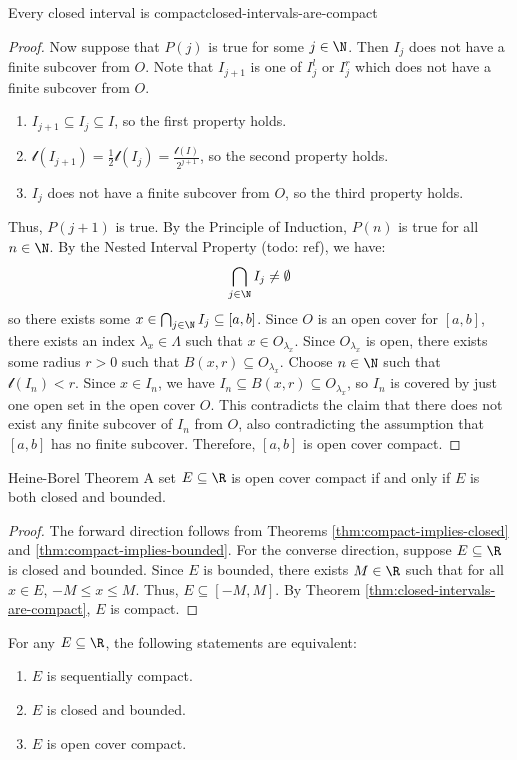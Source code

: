 \begin{thmbox}{Every closed interval is compact}{closed-intervals-are-compact}
\begin{proof}
        Now suppose that $P(j)$ is true for some $j \in \N$. Then $I_j$ does not have a finite subcover from $O$.
        Note that $I_{j+1}$ is one of $I_j^l$ or $I_j^r$ which does not have a finite subcover from $O$.
        \begin{enumerate}
            \item $I_{j+1} \subseteq I_j \subseteq I$, so the first property holds.
            \item $\mathscr{l}(I_{j+1}) = \frac{1}{2} \mathscr{l}(I_j) = \frac{\mathscr{l}(I)}{2^{j+1}}$, so the second property holds.
            \item $I_j$ does not have a finite subcover from $O$, so the third property holds.
        \end{enumerate}
        Thus, $P(j+1)$ is true. By the Principle of Induction, $P(n)$ is true for all $n \in \N$. By the Nested Interval Property (todo: ref), we have:
        \[ \bigcap_{j \in \N} I_j \neq \emptyset \]
        so there exists some $x \in \bigcap_{j \in \N} I_j \subseteq [a,b]$. Since $O$ is an open cover for $[a,b]$, there exists an index $\lambda_x \in \Lambda$ such that $x \in O_{\lambda_x}$. Since $O_{\lambda_x}$ is open, there exists some radius $r > 0$ such that $B(x,r) \subseteq O_{\lambda_x}$. Choose $n \in \N$ such that $\mathscr{l}(I_n) < r $. Since $x \in I_n$, we have $I_n \subseteq B(x,r) \subseteq O_{\lambda_x}$, so $I_n$ is covered by just one open set in the open cover $O$. This contradicts the claim that there does not exist any finite subcover of $I_n$ from $O$, also contradicting the assumption that $[a,b]$ has no finite subcover. Therefore, $[a,b]$ is open cover compact.
    \end{proof}
\end{thmbox}

\begin{thmbox}{Heine-Borel Theorem}{}
    A set $E \subseteq \R$ is open cover compact if and only if $E$ is both closed and bounded.
    \tcblower
    \begin{proof}
        The forward direction follows from Theorems \ref{thm:compact-implies-closed} and \ref{thm:compact-implies-bounded}. For the converse direction, suppose $E \subseteq \R$ is closed and bounded. Since $E$ is bounded, there exists $M \in \R$ such that for all $x \in E$, $-M \leq x \leq M$. Thus, $E \subseteq [-M, M]$. By Theorem \ref{thm:closed-intervals-are-compact}, $E$ is compact.
    \end{proof}
\end{thmbox}

For any $E \subseteq \R$, the following statements are equivalent:
\begin{enumerate}[noitemsep]
    \item $E$ is sequentially compact.
    \item $E$ is closed and bounded.
    \item $E$ is open cover compact.
\end{enumerate}
